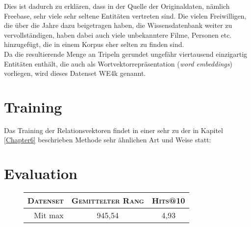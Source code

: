 Dies ist dadurch zu erklären, dass in der Quelle der Originaldaten, nämlich Freebase,
sehr viele sehr seltene Entitäten vertreten sind. Die vielen Freiwilligen, die über die
Jahre dazu beigetragen haben, die Wissensdatenbank weiter zu vervollständigen, haben dabei auch
viele unbekanntere Filme, Personen etc. hinzugefügt, die in einem Korpus eher selten zu finden sind.\\

Da die resultierende Menge an Tripeln gerundet ungefähr viertausend einzigartig Entitäten enthält, die auch als
Wortvektorrepräsentation (\emph{word embeddings}) vorliegen, wird dieses Datenset WE4k genannt.

\section{Training}

Das Training der Relationsvektoren findet in einer sehr zu der in Kapitel \ref{Chapter6} beschrieben Methode sehr
ähnlichen Art und Weise statt:

\section{Evaluation}

\begin{figure}[h]
  \centering
  \begin{tabular}{r||c|c}
    \textsc{Datenset} & \textsc{Gemittelter Rang} & \textsc{Hits@10} \\
     \hline
     Mit max & 945,54 & 4,93 \\
  \end{tabular}
  \caption[Resultate auf mit Wordvektoren auf WE3k]{}
\end{figure}
